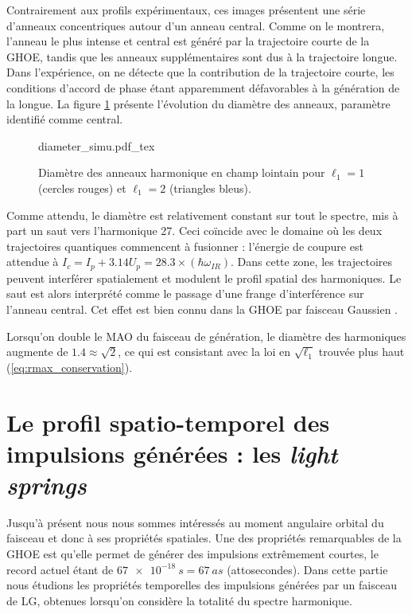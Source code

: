 Contrairement aux profils expérimentaux, ces images présentent une série d'anneaux concentriques autour d'un anneau central. Comme on le montrera, l'anneau le plus intense et central est généré par la trajectoire courte de la GHOE, tandis que les anneaux supplémentaires sont dus à la trajectoire longue. Dans l'expérience, on ne détecte que la contribution de la trajectoire courte, les conditions d'accord de phase étant apparemment défavorables à la génération de la longue. La figure \ref{Fig:DiamSimu} présente l'évolution du diamètre des anneaux, paramètre identifié comme central.

\begin{figure}[!ht]
\centering
\def\svgwidth{.9\columnwidth}
{diameter_simu.pdf_tex}
\caption{Diamètre des anneaux harmonique en champ lointain pour $\ell_1=1$ (cercles rouges) et $\ell_1=2$ (triangles bleus).}
\label{Fig:DiamSimu}
\end{figure}

Comme attendu, le diamètre est relativement constant sur tout le spectre, mis à part un saut vers l'harmonique 27. Ceci coïncide avec le domaine où les deux trajectoires quantiques commencent à fusionner : l'énergie de coupure est attendue à $I_c=I_p+3.14U_p=28.3\times(\hbar\omega_{IR})$. Dans cette zone, les trajectoires peuvent interférer spatialement et modulent le profil spatial des harmoniques. Le saut est alors interprété comme le passage d'une frange d'interférence sur l'anneau central. Cet effet est bien connu dans la GHOE par faisceau Gaussien .\par
Lorsqu'on double le MAO du faisceau de génération, le diamètre des harmoniques augmente de $1.4\approx\sqrt{2}$, ce qui est consistant avec la loi en $\sqrt{\ell_1}$ trouvée plus haut (\ref{eq:rmax_conservation}). 

\chapter{Le profil spatio-temporel des impulsions générées : les \textit{light springs}}
Jusqu'à présent nous nous sommes intéressés au moment angulaire orbital du faisceau et donc à ses propriétés spatiales. Une des propriétés remarquables de la GHOE est qu'elle permet de générer des impulsions extrêmement courtes, le record actuel étant de $\SI{67e-18}{s}=\SI{67}{as}$ (attosecondes). Dans cette partie nous étudions les propriétés temporelles des impulsions générées par un faisceau de LG, obtenues lorsqu'on considère la totalité du spectre harmonique.

